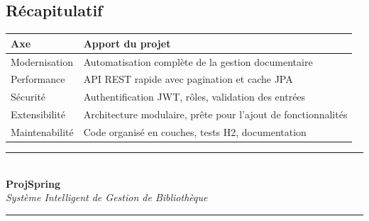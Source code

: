 \documentclass[12pt,a4paper]{article}
\newcommand{\tableheader}[1]{%
  \cellcolor{navy}\color{white}\bfseries #1%
}
\begin{document}
\subsection{R\'ecapitulatif}
\begin{center}
\begin{tabularx}{\textwidth}{|X|X|}
\hline
\tableheader{Axe} & \tableheader{Apport du projet} \\
\hline
Modernisation & Automatisation compl\`ete de la gestion documentaire \\
Performance & API REST rapide avec pagination et cache JPA \\
S\'ecurit\'e & Authentification JWT, r\^oles, validation des entr\'ees \\
Extensibilit\'e & Architecture modulaire, pr\^ete pour l'ajout de fonctionnalit\'es \\
Maintenabilit\'e & Code organis\'e en couches, tests H2, documentation \\
\hline
\end{tabularx}
\end{center}

\vspace{1cm}
\begin{center}
\textcolor{navy}{\rule{0.6\linewidth}{1pt}}\\[0.5cm]
{\large\textbf{ProjSpring}}\\[0.2cm]
{\small\textit{Syst\`eme Intelligent de Gestion de Biblioth\`eque}}\\[0.5cm]
\textcolor{navy}{\rule{0.6\linewidth}{1pt}}
\end{center}
\end{document}
